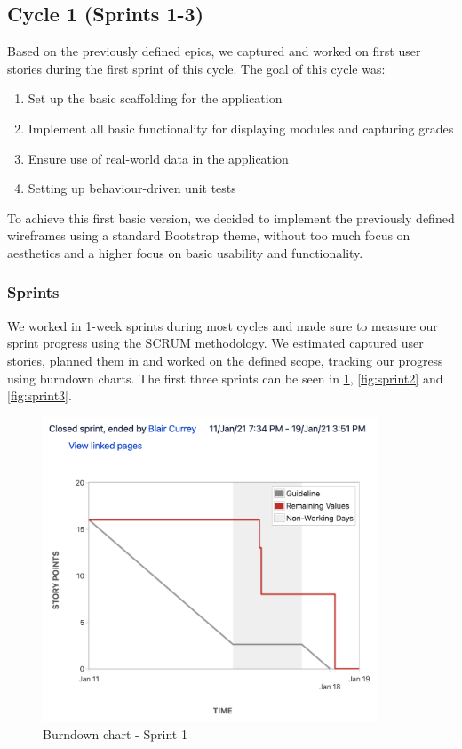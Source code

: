 \subsection{Cycle 1 (Sprints 1-3)}\label{sec:cycle1}
Based on the previously defined epics, we captured and worked on first user stories during the first sprint of this cycle. The goal of this cycle was:

\begin{enumerate}
    \item Set up the basic scaffolding for the application
    \item Implement all basic functionality for displaying modules and capturing grades
    \item Ensure use of real-world data in the application
    \item Setting up behaviour-driven unit tests
\end{enumerate}

To achieve this first basic version, we decided to implement the previously defined wireframes using a standard Bootstrap theme, without too much focus on aesthetics and a higher focus on basic usability and functionality.

\subsubsection{Sprints}
We worked in 1-week sprints during most cycles and made sure to measure our sprint progress using the SCRUM methodology. We estimated captured user stories, planned them in and worked on the defined scope, tracking our progress using burndown charts. The first three sprints can be seen in \cref{fig:sprint1}, \cref{fig:sprint2} and \cref{fig:sprint3}. 

\begin{figure}[H]
    \centering
    \includegraphics[width=10cm]{images/sprint1.png}
    \caption{Burndown chart - Sprint 1}
    \label{fig:sprint1}
\end{figure}

